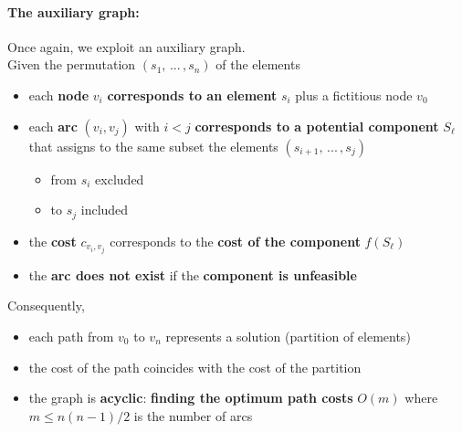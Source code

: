 \paragraph{The auxiliary graph:} Once again, we exploit an auxiliary graph. \\
Given the permutation $(s_1, \, ... \, , s_n)$ of the elements
\begin{itemize}
	\item each \textbf{node} $v_i$ \textbf{corresponds to an element} $s_i$ plus a fictitious node $v_0$
	
	\item each \textbf{arc} $(v_i , v_j )$ with $i < j$ \textbf{corresponds to a potential component} $S_{\ell}$ that assigns to the same subset the elements $(s_{i+1}, \, ... \, , s_j)$
	\begin{itemize}
		\item from $s_i$ excluded
		\item to $s_j$ included
	\end{itemize}
	
	\item the \textbf{cost} $c_{v_i ,v_j}$ corresponds to the \textbf{cost of the component} $f (S_{\ell})$
	
	\item the \textbf{arc does not exist} if the \textbf{component is unfeasible}
\end{itemize}

Consequently,
\begin{itemize}
	\item each path from $v_0$ to $v_n$ represents a solution (partition of elements)
	
	\item the cost of the path coincides with the cost of the partition
	
	\item the graph is \textbf{acyclic}: \textbf{finding the optimum path costs} $O (m)$ where $m \le n (n − 1) /2$ is the number of arcs
\end{itemize}

\newpage

